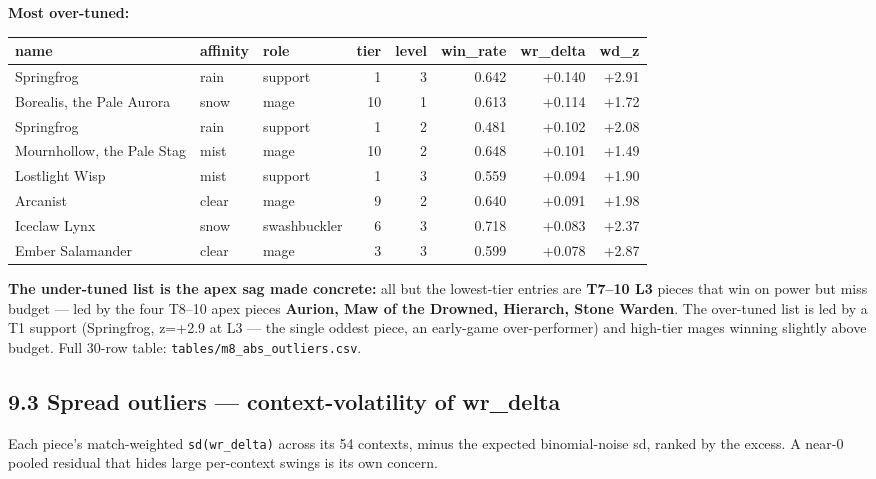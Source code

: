 \documentclass[10pt]{article}
\begin{document}
\textbf{Most over-tuned:}\\

\medskip
\begin{tabularx}{\linewidth}{LLLrrrrr}
\toprule
\textbf{name} & \textbf{affinity} & \textbf{role} & \textbf{tier} & \textbf{level} & \textbf{win\_rate} & \textbf{wr\_delta} & \textbf{wd\_z} \\
\midrule
Springfrog & rain & support & 1 & 3 & 0.642 & +0.140 & +2.91 \\
Borealis, the Pale Aurora & snow & mage & 10 & 1 & 0.613 & +0.114 & +1.72 \\
Springfrog & rain & support & 1 & 2 & 0.481 & +0.102 & +2.08 \\
Mournhollow, the Pale Stag & mist & mage & 10 & 2 & 0.648 & +0.101 & +1.49 \\
Lostlight Wisp & mist & support & 1 & 3 & 0.559 & +0.094 & +1.90 \\
Arcanist & clear & mage & 9 & 2 & 0.640 & +0.091 & +1.98 \\
Iceclaw Lynx & snow & swashbuckler & 6 & 3 & 0.718 & +0.083 & +2.37 \\
Ember Salamander & clear & mage & 3 & 3 & 0.599 & +0.078 & +2.87 \\
\bottomrule
\end{tabularx}
\medskip

\textbf{The under-tuned list is the apex sag made concrete:} all but the lowest-tier entries are \textbf{T7--10 L3} pieces that win on power but miss budget --- led by the four T8--10 apex pieces \textbf{Aurion, Maw of the Drowned, Hierarch, Stone Warden}. The over-tuned list is led by a T1 support (Springfrog, z=+2.9 at L3 --- the single oddest piece, an early-game over-performer) and high-tier mages winning slightly above budget. Full 30-row table: \texttt{tables/\allowbreak{}m8\_\allowbreak{}abs\_\allowbreak{}outliers.\allowbreak{}csv}.\\

\subsection*{9.3 Spread outliers --- context-volatility of wr\_delta}

Each piece's match-weighted \texttt{sd(\allowbreak{}wr\_\allowbreak{}delta)\allowbreak{}} across its 54 contexts, minus the expected binomial-noise sd, ranked by the excess. A near-0 pooled residual that hides large per-context swings is its own concern.\\
\end{document}
